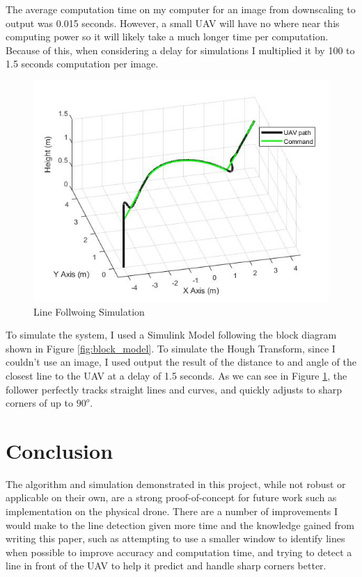\documentclass[10pt,twocolumn,letterpaper]{article}
\begin{document}
	The average computation time on my computer for an image from downscaling to output was 0.015 seconds. However, a small UAV will have no where near this computing power so it will likely take a much longer time per computation. Because of this, when considering a delay for simulations I multiplied it by 100 to 1.5 seconds computation per image. 

	\begin{figure}[!t] %
		\begin{center}
			\includegraphics[width=\linewidth]{matlab/combo_path}
		\end{center}
		\caption{Line Follwoing Simulation}
		\label{fig:simulation}
	\end{figure}	

	To simulate the system, I used a Simulink Model following the block diagram shown in Figure \ref{fig:block_model}. To simulate the Hough Transform, since I couldn't use an image, I used output the result of the distance to and angle of the closest line to the UAV at a delay of 1.5 seconds. As we can see in Figure \ref{fig:simulation}, the follower perfectly tracks straight lines and curves, and quickly adjusts to sharp corners of up to $90^o$.

	\section{Conclusion}
	The algorithm and simulation demonstrated in this project, while not robust or applicable on their own, are a strong proof-of-concept for future work such as implementation on the physical drone. There are a number of improvements I would make to the line detection given more time and the knowledge gained from writing this paper, such as attempting to use a smaller window to identify lines when possible to improve accuracy and computation time, and trying to detect a line in front of the UAV to help it predict and handle sharp corners better. 
\end{document}
